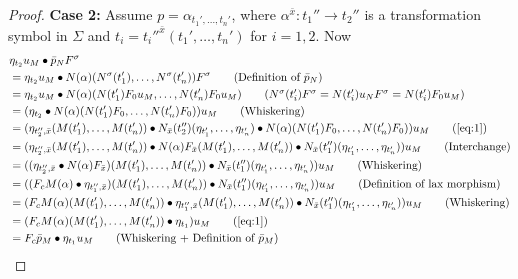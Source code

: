 \documentclass[11pt]{article}
\theoremstyle{plain}
\theoremstyle{definition}
\numberwithin{equation}{section}
\begin{document}
\begin{proof}
   \noindent\textbf{Case 2:} Assume $p = \alpha_{t_1',\ldots, t_n'}$, where $\alpha^{\bar{x}}\colon t_1''\to t_2''$ is a transformation symbol in $\Sigma$ and $t_i = t_i''^{\bar{x}}(t_1',\ldots, t_n')$ for $i = 1,2$.
   Now
     {\small \begin{align*}
       &\eta_{t_2}u_M\bullet \bar{p}_NF^\sigma\\
       &= \eta_{t_2}u_M\bullet N(\alpha)(N^\sigma(t_1'),\ldots, N^\sigma(t_n'))F^\sigma\tag{Definition of $\bar{p}_N $}\\
       &= \eta_{t_2}u_M\bullet N(\alpha)(N(t_1')F_0u_M, \ldots, N(t_n')F_0u_M)\tag{$N^\sigma(t_i')F^\sigma = N(t_i')u_N F^\sigma = N(t_i')F_0u_M$}\\
       &= (\eta_{t_2}\bullet N(\alpha)(N(t_1')F_0,\dots, N(t_n')F_0))u_M \tag{Whiskering}\\
       &= (\eta_{t_2'',\bar{x}}(M(t_1'),\ldots, M(t_n'))\bullet N_{\bar{x}}(t_2'')(\eta_{t_1'},\ldots, \eta_{t_n'})\bullet N(\alpha)(N(t_1')F_0,\dots, N(t_n')F_0))u_M \tag{\ref{eq:1}}\\
       &= (\eta_{t_2'',\bar{x}}(M(t_1'),\ldots, M(t_n'))\bullet N(\alpha)F_{\bar{x}}(M(t_1'),\dots, M(t_n'))\bullet N_{\bar{x}}(t_1'')(\eta_{t_1'},\ldots, \eta_{t_n'}))u_M\tag{Interchange}\\
       &= ((\eta_{t_2'',\bar{x}}\bullet N(\alpha)F_{\bar{x}})(M(t_1'),\ldots, M(t_n'))\bullet N_{\bar{x}}(t_1'')(\eta_{t_1'},\ldots, \eta_{t_n'}))u_M\tag{Whiskering}\\
       &= ((F_cM(\alpha)\bullet\eta_{t_1'',\bar{x}})(M(t_1'),\ldots, M(t_n'))\bullet N_{\bar{x}}(t_1'')(\eta_{t_1'},\ldots, \eta_{t_n'}))u_M\tag{Definition of lax morphism}\\
       &= (F_cM(\alpha)(M(t_1'),\ldots, M(t_n'))\bullet \eta_{t_1'',\bar{x}}(M(t_1'),\ldots, M(t_n'))\bullet N_{\bar{x}}(t_1'')(\eta_{t_1'},\ldots, \eta_{t_n'}))u_M \tag{Whiskering}\\
       &= (F_cM(\alpha)(M(t_1'),\ldots, M(t_n'))\bullet \eta_{t_1})u_M\tag{\ref{eq:1}}\\
       &= F_c\bar{p}_M \bullet \eta_{t_1}u_M\tag{Whiskering + Definition of $\bar{p}_M$}
   \end{align*}
   }
  

\end{proof}
\end{document}
